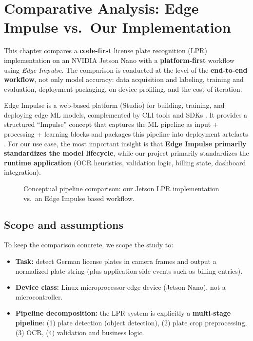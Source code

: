 %
%
%

\chapter{Comparative Analysis: Edge Impulse vs.\ Our Implementation}
\label{sec:edge_impulse_compare}

\noindent
This chapter compares a \textbf{code-first} license plate recognition (LPR) implementation on an NVIDIA Jetson Nano with a \textbf{platform-first} workflow using \textit{Edge Impulse}.
The comparison is conducted at the level of the \textbf{end-to-end workflow}, not only model accuracy:
data acquisition and labeling, training and evaluation, deployment packaging, on-device profiling, and the cost of iteration.

\noindent
Edge Impulse is a web-based platform (Studio) for building, training, and deploying edge ML models, complemented by CLI tools and SDKs \cite{EdgeImpulseStudioOverview}.
It provides a structured ``Impulse'' concept that captures the ML pipeline as input + processing + learning blocks and packages this pipeline into deployment artefacts \cite{EdgeImpulseImpulseDesign}.
For our use case, the most important insight is that \textbf{Edge Impulse primarily standardizes the model lifecycle}, while our project primarily standardizes the \textbf{runtime application} (OCR heuristics, validation logic, billing state, dashboard integration).

\begin{figure}[htbp]
	\centering
	
	\caption{Conceptual pipeline comparison: our Jetson LPR implementation vs.\ an Edge Impulse based workflow.}
	\label{fig:edge_impulse_pipeline_compare}
\end{figure}

\section{Scope and assumptions}
\label{sec:edge_impulse_scope}

\noindent
To keep the comparison concrete, we scope the study to:
\begin{itemize}
	\item \textbf{Task:} detect German license plates in camera frames and output a normalized plate string (plus application-side events such as billing entries).
	\item \textbf{Device class:} Linux microprocessor edge device (Jetson Nano), not a microcontroller.
	\item \textbf{Pipeline decomposition:} the LPR system is explicitly a \textbf{multi-stage pipeline}:
	(1) plate detection (object detection), (2) plate crop preprocessing, (3) OCR, (4) validation and business logic.
\end{itemize}

